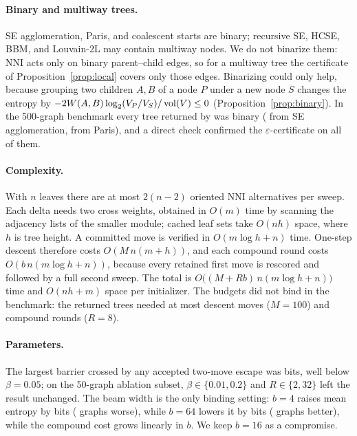\paragraph{Binary and multiway trees.}
SE agglomeration, Paris, and coalescent starts are binary; recursive SE, HCSE,
BBM, and Louvain-2L may contain multiway nodes. We do not binarize them: NNI
acts only on binary parent--child edges, so for a multiway tree the certificate
of Proposition~\ref{prop:local} covers only those edges. Binarizing could only
help, because grouping two children $A,B$ of a node $P$ under a new node $S$
changes the entropy by $-2W(A,B)\log_2(V_P/V_S)/\operatorname{vol}(V)\le0$
(Proposition~\ref{prop:binary}). In the 500-graph benchmark every tree returned
by \NEST was binary (\CertFromAgg{} from SE agglomeration, \CertFromParis{} from
Paris), and a direct check confirmed the $\varepsilon$-certificate on all
\CertGraphs{} of them.

\paragraph{Complexity.}
With $n$ leaves there are at most $2(n-2)$ oriented NNI alternatives per sweep.
Each delta needs two cross weights, obtained in $O(m)$ time by scanning the
adjacency lists of the smaller module; cached leaf sets take $O(nh)$ space,
where $h$ is tree height. A committed move is verified in $O(m\log h+n)$ time.
One-step descent therefore costs $O(M\,n(m+h))$, and each compound round costs
$O(b\,n(m\log h+n))$, because every retained first move is rescored and
followed by a full second sweep. The total is
$O\bigl((M+Rb)\,n(m\log h+n)\bigr)$ time and $O(nh+m)$ space per initializer.
The budgets did not bind in the benchmark: the returned trees needed at most
\CertMaxDescent{} descent moves ($M=100$) and \CertMaxCompound{} compound
rounds ($R=8$).

\paragraph{Parameters.}
The largest barrier crossed by any accepted two-move escape was \MaxBarrier{}
bits, well below $\beta=0.05$; on the 50-graph ablation subset,
$\beta\in\{0.01,0.2\}$ and $R\in\{2,32\}$ left the result unchanged. The beam
width is the only binding setting: $b=4$ raises mean entropy by \SensBFourLoss{}
bits (\SensBFourHigher{} graphs worse), while $b=64$ lowers it by
\SensBSixtyFourGain{} bits (\SensBSixtyFourLower{} graphs better), while the compound cost grows linearly
in $b$. We keep $b=16$ as a compromise.

